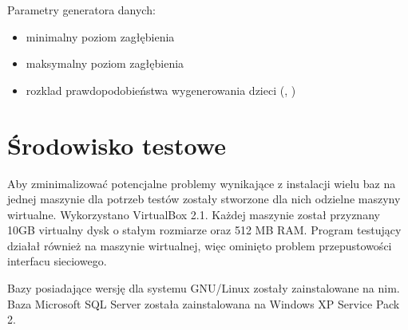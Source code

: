 Parametry generatora danych:
\begin{itemize}
 \item minimalny poziom zagłębienia
 \item maksymalny poziom zagłębienia
 \item rozklad prawdopodobieństwa wygenerowania dzieci (\cite{asdf}, \cite[Ala]{asdf})
\end{itemize}


\section{Środowisko testowe}

Aby zminimalizować potencjalne problemy wynikające z instalacji wielu baz na jednej maszynie dla potrzeb testów zostały stworzone dla nich odzielne maszyny wirtualne. Wykorzystano VirtualBox 2.1. Każdej maszynie został przyznany 10GB virtualny dysk o stałym rozmiarze oraz 512 MB RAM. Program testujący działał również na maszynie wirtualnej, więc ominięto problem przepustowości interfacu sieciowego. 

Bazy posiadające wersję dla systemu GNU/Linux zostały zainstalowane na nim. Baza Microsoft SQL Server została zainstalowana na Windows XP Service Pack 2.
